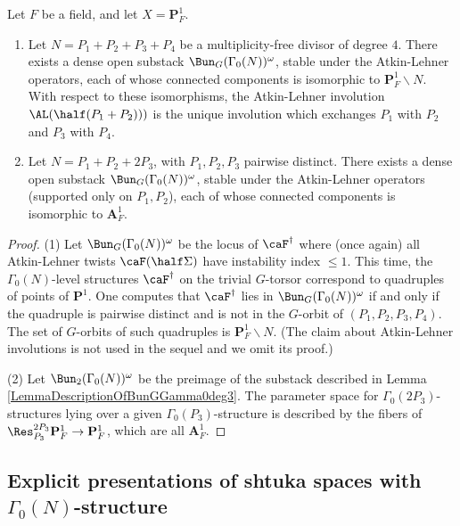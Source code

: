 \documentclass{article}
\def\PP{\mathbf{P}}
\def\P{\mathbf{P}}
\begin{document}
\begin{lm}\label{LemmaDescriptionOfBunGGamma0}
Let $F$ be a field, and let $X=\PP^1_F$.  
\begin{enumerate}
\item Let $N=P_1+P_2+P_3+P_4$ be a multiplicity-free divisor of degree $4$.  There exists a dense open substack $\Bun_G(\Gamma_0(N))^{\omega}$, stable under the Atkin-Lehner operators, each of whose connected components is isomorphic to $\PP^1_F\smallsetminus N$.  With respect to these isomorphisms, the Atkin-Lehner involution $\AL(\half (P_1+P_2)))$ is the unique involution which exchanges $P_1$ with $P_2$ and $P_3$ with $P_4$.
\item Let $N=P_1+P_2+2P_3$, with $P_1,P_2,P_3$ pairwise distinct.  There exists a dense open substack $\Bun_G(\Gamma_0(N))^{\omega}$, stable under the Atkin-Lehner operators (supported only on $P_1,P_2$), each of whose connected components is isomorphic to $\mathbf{A}^1_F$.  
\end{enumerate}
\end{lm}

\begin{proof}  (1) Let $\Bun_G(\Gamma_0(N))^{\omega}$ be the locus of $\caF^\dagger$ where (once again) all Atkin-Lehner twists $\caF(\half \Sigma)$ have instability index $\leq 1$.  This time, the $\Gamma_0(N)$-level structures $\caF^\dagger$ on the trivial $G$-torsor correspond to quadruples of points of $\P^1$.  One computes that $\caF^\dagger$ lies in $\Bun_G(\Gamma_0(N))^{\omega}$ if and only if the quadruple is pairwise distinct and is not in the $G$-orbit of $(P_1,P_2,P_3,P_4)$.  The set of $G$-orbits of such quadruples is $\P^1_F\smallsetminus N$.  (The claim about Atkin-Lehner involutions is not used in the sequel and we omit its proof.)

(2) Let $\Bun_2(\Gamma_0(N))^{\omega}$ be the preimage of the substack described in Lemma \ref{LemmaDescriptionOfBunGGamma0deg3}.    The parameter space for $\Gamma_0(2P_3)$-structures lying over a given $\Gamma_0(P_3)$-structure is described by the fibers of $\Res^{2P_3}_{P_3} \PP^1_F\to \PP^1_F$, which are all $\mathbf{A}^1_F$.  


\end{proof}

\subsection{Explicit presentations of shtuka spaces with $\Gamma_0(N)$-structure}
\end{document}
